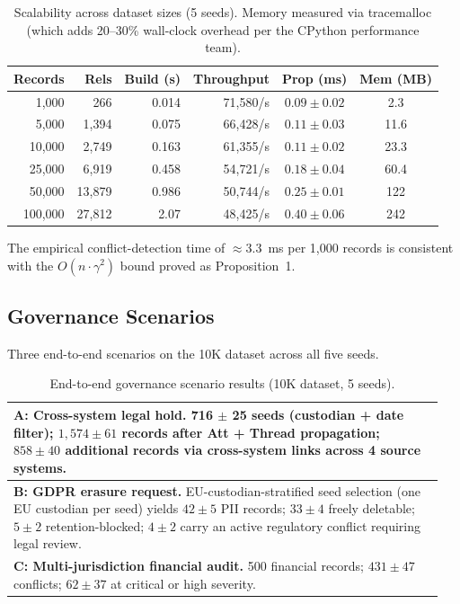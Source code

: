 \documentclass{ieeeaccess}
\begin{document}
\begin{table}[t]
\centering
\caption{Scalability across dataset sizes (5 seeds). Memory measured via tracemalloc (which adds 20--30\% wall-clock overhead per the CPython performance team).}
\label{tab:scalability}
\begin{tabular}{rrrrcc}
\hline\hline
Records & Rels & Build (s) & Throughput & Prop (ms) & Mem (MB) \\
\hline
1{,}000   & 266   & 0.014 & 71{,}580/s & $0.09 \pm 0.02$ & 2.3 \\
5{,}000   & 1{,}394 & 0.075 & 66{,}428/s & $0.11 \pm 0.03$ & 11.6 \\
10{,}000  & 2{,}749 & 0.163 & 61{,}355/s & $0.11 \pm 0.02$ & 23.3 \\
25{,}000  & 6{,}919 & 0.458 & 54{,}721/s & $0.18 \pm 0.04$ & 60.4 \\
50{,}000  & 13{,}879 & 0.986 & 50{,}744/s & $0.25 \pm 0.01$ & 122 \\
100{,}000 & 27{,}812 & 2.07  & 48{,}425/s & $0.40 \pm 0.06$ & 242 \\
\hline\hline
\end{tabular}
\end{table}

The empirical conflict-detection time of $\approx 3.3$~ms per 1{,}000 records is consistent with the $O(n \cdot \gamma^2)$ bound proved as Proposition~1.

\subsection{Governance Scenarios}

Three end-to-end scenarios on the 10K dataset across all five seeds.

\begin{table}[t]
\centering
\caption{End-to-end governance scenario results (10K dataset, 5 seeds).}
\label{tab:scenarios}
\begin{tabular}{p{0.95\linewidth}}
\hline\hline
\textbf{A: Cross-system legal hold.} 716 $\pm$ 25 seeds (custodian + date filter); $1{,}574 \pm 61$ records after Att + Thread propagation; $858 \pm 40$ additional records via cross-system links across 4 source systems. \\
\hline
\textbf{B: GDPR erasure request.} EU-custodian-stratified seed selection (one EU custodian per seed) yields $42 \pm 5$ PII records; $33 \pm 4$ freely deletable; $5 \pm 2$ retention-blocked; $4 \pm 2$ carry an active regulatory conflict requiring legal review. \\
\hline
\textbf{C: Multi-jurisdiction financial audit.} 500 financial records; $431 \pm 47$ conflicts; $62 \pm 37$ at critical or high severity. \\
\hline\hline
\end{tabular}
\end{table}
\end{document}
